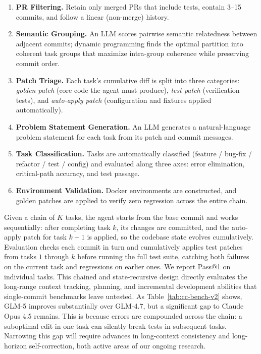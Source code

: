 \documentclass{article}
\theoremstyle{definition}
\begin{document}
\begin{enumerate}[leftmargin=1.5em,itemsep=2pt]
    \item \textbf{PR Filtering.} Retain only merged PRs that include tests, contain 3--15 commits, and follow a linear (non-merge) history.
    \item \textbf{Semantic Grouping.} An LLM scores pairwise semantic relatedness between adjacent commits; dynamic programming finds the optimal partition into coherent task groups that maximize intra-group coherence while preserving commit order.
    \item \textbf{Patch Triage.} Each task's cumulative diff is split into three categories: \emph{golden patch} (core code the agent must produce), \emph{test patch} (verification tests), and \emph{auto-apply patch} (configuration and fixtures applied automatically).
    \item \textbf{Problem Statement Generation.} An LLM generates a natural-language problem statement for each task from its patch and commit messages.
    \item \textbf{Task Classification.} Tasks are automatically classified (feature / bug-fix / refactor / test / config) and evaluated along three axes: error elimination, critical-path accuracy, and test passage.
    \item \textbf{Environment Validation.} Docker environments are constructed, and golden patches are applied to verify zero regression across the entire chain.
\end{enumerate}

Given a chain of $K$ tasks, the agent starts from the base commit and works sequentially: after completing task $k$, its changes are committed, and the auto-apply patch for task $k{+}1$ is applied, so the codebase state evolves cumulatively. Evaluation checks each commit in turn and cumulatively applies test patches from tasks $1$ through $k$ before running the full test suite, catching both failures on the current task and regressions on earlier ones. We report Pass@1 on individual tasks. This chained and state-recursive design directly evaluates the long-range context tracking, planning, and incremental development abilities that single-commit benchmarks leave untested. As Table~\ref{tab:cc-bench-v2} shows, GLM-5 improves substantially over GLM-4.7, but a significant gap to Claude Opus 4.5 remains. This is because errors are compounded across the chain: a suboptimal edit in one task can silently break tests in subsequent tasks. Narrowing this gap will require advances in long-context consistency and long-horizon self-correction, both active areas of our ongoing research.
\end{document}

